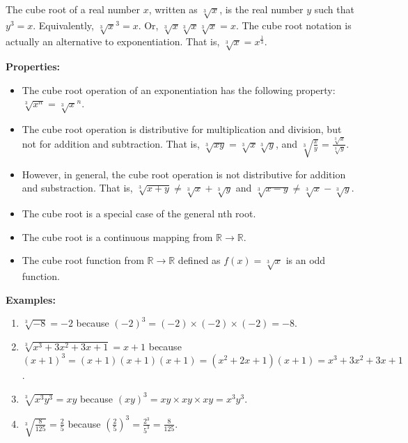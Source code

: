 \documentclass{article}
\begin{document}

The cube root of a real number $x$, written as $\sqrt[3]{x}$, is the real number $y$ such that $y^3 = x$.
Equivalently, $\sqrt[3]{x}^3 = x$.  Or, $\sqrt[3]{x}\sqrt[3]{x}\sqrt[3]{x} = x$. The cube root notation is actually an alternative to exponentiation.  That is, $\sqrt[3]{x} = x^\frac{1}{3}$.  

\textbf{Properties:}
\begin{itemize}
\item The cube root operation of an exponentiation has the following property:  $\sqrt[3]{x^n} = \sqrt[3]{x}^n$.
\item The cube root operation is distributive for multiplication and division, but not for addition and subtraction. That is, $\sqrt[3]{xy} = \sqrt[3]{x} \sqrt[3]{y}$, and $\sqrt[3]{\frac{x}{y}} = \frac{\sqrt[3]{x}}{\sqrt[3]{y}}$.

\item  However, in general, the cube root operation is not distributive for addition and substraction.  That is, $\sqrt[3]{x + y} \not= \sqrt[3]{x} + \sqrt[3]{y}$ and $\sqrt[3]{x - y} \not= \sqrt[3]{x} - \sqrt[3]{y}$.

\item The cube root is a special case of the general nth root.

\item The cube root is a continuous mapping from $\mathbb{R} \to \mathbb{R}$.

\item The cube root function from $\mathbb{R} \to \mathbb{R}$ defined as $f(x)=\sqrt[3]{x}$ is an odd function.

\end{itemize}

\textbf{Examples:}
\begin{enumerate}
\item $\sqrt[3]{-8} = -2$ because $(-2)^3 = (-2) \times (-2) \times (-2) = -8$.
\item $\sqrt[3]{x^3 + 3x^2 + 3x + 1} = x + 1$ because
$(x + 1)^3 = (x + 1)(x + 1)(x + 1) = (x^2 + 2x + 1)(x + 1) = x^3 + 3x^2 + 3x + 1$.
\item $\sqrt[3]{x^{3}y^{3}} = xy$ because
$(xy)^3 = xy \times xy \times xy = x^{3}y^{3}$.
\item $\sqrt[3]{\frac{8}{125}} = \frac{2}{5}$ because $(\frac{2}{5})^3 = \frac{2^3}{5^3} = \frac{8}{125}$.
\end{enumerate}
\end{document}
